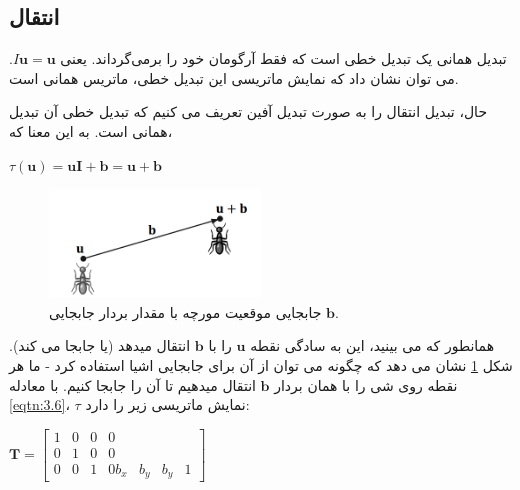 \subsection{\textbf{انتقال}}
\label{subsec:3.2.3}
{
    \Large
    \begin{spacing}{1.5}
        تبدیل همانی یک تبدیل خطی است که فقط آرگومان خود را برمی‌گرداند.
        یعنی $I\textbf{u}=\textbf{u}$.
        می توان نشان داد که نمایش ماتریسی این تبدیل خطی، ماتریس همانی است.

        حال، تبدیل انتقال را به صورت تبدیل آفین تعریف می کنیم که تبدیل خطی آن تبدیل همانی است. به این معنا که،

        \begin{center}
            $\tau(\textbf{u})=\textbf{uI}+\textbf{b}=\textbf{u}+\textbf{b}$
        \end{center}

        \begin{figure}[H]
            \centering
            \setlength{\belowcaptionskip}{-10pt}
            \includegraphics[width=0.5\textwidth]{Images/4/3/4.Session.1.3.5}
            \caption {جابجایی موقعیت مورچه با مقدار بردار جابجایی $\textbf{b}$.}
            \label{fig:4.Session.1.3.5}
        \end{figure}

        همانطور که می بینید، این به سادگی نقطه $\textbf{u}$ را با $\textbf{b}$ انتقال میدهد (یا جابجا می کند).
        شکل \ref{fig:4.Session.1.3.5} نشان می دهد که چگونه می توان از آن برای جابجایی اشیا استفاده کرد - ما هر نقطه روی شی را با همان بردار $\textbf{b}$ انتقال میدهیم تا آن را جابجا کنیم.
        با معادله \ref{eqtn:3.6}، $\tau$ نمایش ماتریسی زیر را دارد:

        \begin{center}
            $\textbf{T}=\begin{bmatrix}
                            1 & 0 & 0 & 0 \\
                            0 & 1 & 0 & 0 \\
                            0 & 0 & 1 & 0
                            b_{x} & b_{y} & b_{y} & 1
            \end{bmatrix}$
        \end{center}


\end{spacing}}
